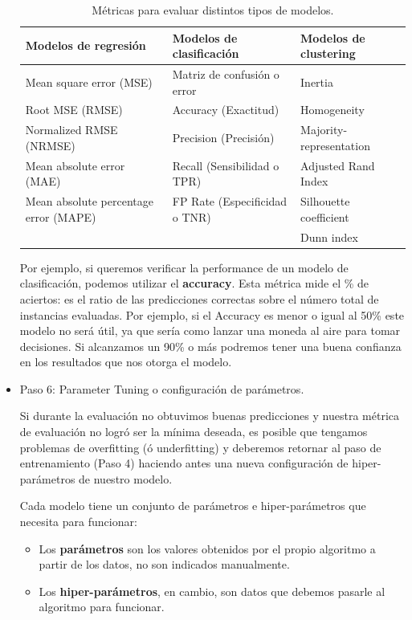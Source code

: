 \documentclass[12pt,a4paper]{article}
\begin{document}
\begin{sloppypar}
\begin{itemize}
\begin{table}[h!]
\centering
\begin{tabular}{|p{6cm}||p{5cm}||p{5cm}|}
\hline
\textbf{Modelos de regresión} & \textbf{Modelos de clasificación} & \textbf{Modelos de clustering} \\ [1ex] 
\hline
Mean square error (MSE)  & Matriz de confusión o error & Inertia \\
\hline
Root MSE (RMSE)  & Accuracy (Exactitud) & Homogeneity \\
\hline
Normalized RMSE (NRMSE)  & Precision (Precisión) & Majority-representation \\
\hline
Mean absolute error (MAE)   & Recall (Sensibilidad o TPR) & Adjusted Rand Index \\
\hline
Mean absolute percentage error (MAPE)  & FP Rate (Especificidad o TNR) & Silhouette coefficient \\
\hline
  &  &  Dunn index \\
\hline
\end{tabular}
\caption{Métricas para evaluar distintos tipos de modelos\cite{metrics_clustering_1, metrics_clustering_2,metrics_clasification,metrics_regression}.} 
\label{table:1}
\end{table}

Por ejemplo, si queremos verificar la performance de un modelo de clasificación, podemos utilizar el \textbf{accuracy}. Esta métrica mide el \% de aciertos: es el ratio de las predicciones correctas sobre el número total de instancias evaluadas. Por ejemplo, si el Accuracy es menor o igual al 50\% este modelo no será útil, ya que sería como lanzar una moneda al aire para tomar decisiones. Si alcanzamos un 90\% o más podremos tener una buena confianza en los resultados que nos otorga el modelo.\\

\item Paso 6: Parameter Tuning o configuración de parámetros\cite{apunte_uba}.

Si durante la evaluación no obtuvimos buenas predicciones y nuestra métrica de evaluación no logró ser la mínima deseada, es posible que tengamos problemas de overfitting (ó underfitting) y deberemos retornar al paso de entrenamiento (Paso 4) haciendo antes una nueva configuración de hiper-parámetros de nuestro modelo. 

Cada modelo tiene un conjunto de parámetros e hiper-parámetros que necesita para funcionar:
\begin{itemize}
\item Los \textbf{parámetros} son los valores obtenidos por el propio algoritmo a partir de los datos, no son indicados manualmente. 
\item Los \textbf{hiper-parámetros}, en cambio, son datos que debemos pasarle al algoritmo para funcionar. 
\end{itemize}


\end{itemize}
\end{sloppypar}
\end{document}
